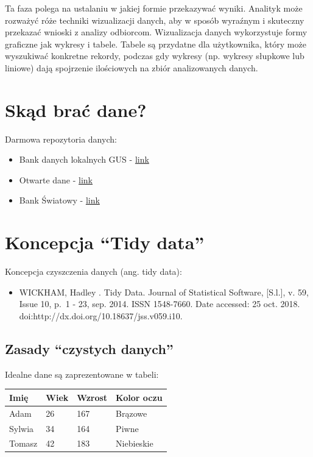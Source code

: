 \documentclass[
  polish,
  letterpaper,
  DIV=11,
  numbers=noendperiod]{scrreprt}
\providecommand{\tightlist}{%
  \setlength{\itemsep}{0pt}\setlength{\parskip}{0pt}}
\begin{document}
Ta faza polega na ustalaniu w jakiej formie przekazywać wyniki. Analityk
może rozważyć róże techniki wizualizacji danych, aby w sposób wyraźnym i
skuteczny przekazać wnioski z analizy odbiorcom. Wizualizacja danych
wykorzystuje formy graficzne jak wykresy i tabele. Tabele są przydatne
dla użytkownika, który może wyszukiwać konkretne rekordy, podczas gdy
wykresy (np. wykresy słupkowe lub liniowe) dają spojrzenie ilościowych
na zbiór analizowanych danych.

\section{Skąd brać dane?}\label{skux105d-braux107-dane}

Darmowa repozytoria danych:

\begin{itemize}
\tightlist
\item
  Bank danych lokalnych GUS -
  \href{https://bdl.stat.gov.pl/BDL/start}{link}
\item
  Otwarte dane - \href{https://dane.gov.pl/}{link}
\item
  Bank Światowy - \href{https://data.worldbank.org/}{link}
\end{itemize}

\section{Koncepcja ``Tidy data''}\label{koncepcja-tidy-data}

Koncepcja czyszczenia danych (ang. tidy data):

\begin{itemize}
\tightlist
\item
  WICKHAM, Hadley . Tidy Data. Journal of Statistical Software,
  {[}S.l.{]}, v. 59, Issue 10, p.~1 - 23, sep. 2014. ISSN 1548-7660.
  Date accessed: 25 oct. 2018.
  doi:http://dx.doi.org/10.18637/jss.v059.i10.
\end{itemize}

\subsection{Zasady ``czystych danych''}\label{zasady-czystych-danych}

Idealne dane są zaprezentowane w tabeli:

\begin{longtable}[]{@{}llll@{}}
\toprule\noalign{}
Imię & Wiek & Wzrost & Kolor oczu \\
\midrule\noalign{}
\endhead
\bottomrule\noalign{}
\endlastfoot
Adam & 26 & 167 & Brązowe \\
Sylwia & 34 & 164 & Piwne \\
Tomasz & 42 & 183 & Niebieskie \\
\end{longtable}
\end{document}
